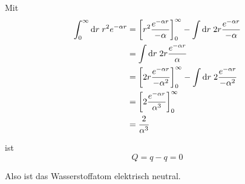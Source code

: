 \documentclass[a4paper,german,12pt,smallheadings]{scrartcl}
\begin{document}
Mit
\begin{align}
  \int_0^\infty \dif r \; r^2 e^{-\alpha r}
  &=
    \sbr[3]{r^2 \frac{e^{-\alpha r}}{-\alpha}}_0^\infty
    - \int \dif r \; 2r \frac{e^{-\alpha r}}{-\alpha} \\
    &= \int \dif r \; 2r \frac{e^{-\alpha r}}{\alpha} \\
    &=  \sbr[3]{2r \frac{e^{-\alpha r}}{-\alpha^2}}_0^\infty
    - \int \dif r \; 2 \frac{e^{-\alpha r}}{-\alpha^2} \\
    &= \sbr[3]{ 2 \frac{e^{-\alpha r}}{\alpha^3}}_0^\infty \\
    &= \frac{2}{\alpha^3}
\end{align}

ist
\begin{equation}
  Q = q - q = 0
\end{equation}

Also ist das Wasserstoffatom elektrisch neutral.
\end{document}
